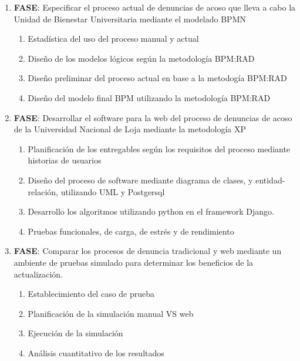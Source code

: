 \begin{enumerate}
    \item \textbf{FASE}: Especificar el proceso actual de denuncias de acoso que lleva a cabo la Unidad de Bienestar Universitaria mediante el modelado BPMN
    \begin{enumerate}
        \item Estadística del uso del proceso manual y actual
        \item Diseño de los modelos lógicos según la metodología BPM:RAD
        \item Diseño preliminar del proceso actual en base a la metodogía BPM:RAD
        \item Diseño del modelo final BPM utilizando la metodología BPM:RAD 
    \end{enumerate}
    
    \item \textbf{FASE}: Desarrollar el software para la web del proceso de denuncias de acoso de la Universidad Nacional de Loja mediante la metodología XP
    \begin{enumerate}
        \item Planificación de los entregables según los requisitos del proceso mediante historias de usuarios
        \item Diseño del proceso de software mediante diagrama de clases, y entidad-relación, utilizando UML y Postgersql
        \item Desarrollo los algoritmos utilizando python en el framework Django.
        \item Pruebas funcionales, de carga, de estrés y de rendimiento
    \end{enumerate}
    
    \item \textbf{FASE}: Comparar los procesos de denuncia tradicional y web mediante un ambiente de pruebas simulado para determinar los beneficios de la actualización.
     \begin{enumerate}
        \item Establecimiento del caso de prueba
        \item Planificación de la simulación manual VS web
        \item Ejecución de la simulación
        \item Análisis cuantitativo de los resultados
    \end{enumerate}
    
\end{enumerate}

